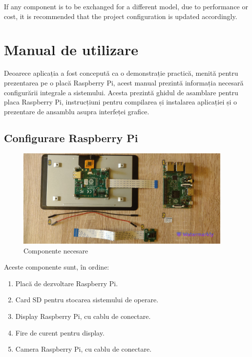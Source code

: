 If any component is to be exchanged for a different model, due to performance or cost, it is recommended that
the project configuration is updated accordingly.

\chapter{Manual de utilizare}

Deoarece aplicația a fost concepută ca o demonstrație practică, menită pentru prezentarea pe o placă Raspberry Pi,
acest manual prezintă informația necesară configurării integrale a sistemului. Acesta prezintă ghidul de
asamblare pentru placa Raspberry Pi, instrucțiuni pentru compilarea și instalarea aplicației și o prezentare
de ansamblu asupra interfeței grafice.

\section{Configurare Raspberry Pi}

\begin{figure}[H]
	\includegraphics[width=0.95\textwidth, height=0.5\textwidth]{resources/Manual_Components.jpg}
	\caption{Componente necesare}
\end{figure}

Aceste componente sunt, în ordine:
\begin{enumerate}
	\item Placă de dezvoltare Raspberry Pi.
	\item Card SD pentru stocarea sistemului de operare.
	\item Display Raspberry Pi, cu cablu de conectare.
	\item Fire de curent pentru display.
	\item Camera Raspberry Pi, cu cablu de conectare.
\end{enumerate}

